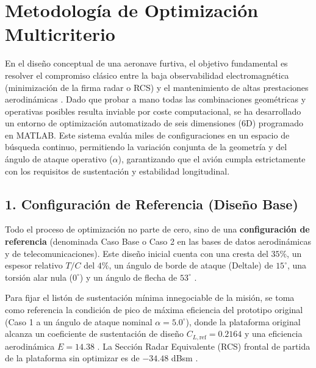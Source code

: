 \documentclass[11pt, a4paper]{article}
\begin{document}
\section*{Metodología de Optimización Multicriterio}

En el diseño conceptual de una aeronave furtiva, el objetivo fundamental es resolver el compromiso clásico entre la baja observabilidad electromagnética (minimización de la firma radar o RCS) y el mantenimiento de altas prestaciones aerodinámicas \cite{raymer, deb}. Dado que probar a mano todas las combinaciones geométricas y operativas posibles resulta inviable por coste computacional, se ha desarrollado un entorno de optimización automatizado de seis dimensiones (6D) programado en MATLAB. Este sistema evalúa miles de configuraciones en un espacio de búsqueda continuo, permitiendo la variación conjunta de la geometría y del ángulo de ataque operativo ($\alpha$), garantizando que el avión cumpla estrictamente con los requisitos de sustentación y estabilidad longitudinal.

\subsection*{1. Configuración de Referencia (Diseño Base)}
Todo el proceso de optimización no parte de cero, sino de una \textbf{configuración de referencia} (denominada Caso Base o Caso 2 en las bases de datos aerodinámicas y de telecomunicaciones). Este diseño inicial cuenta con una cresta del $35\%$, un espesor relativo $T/C$ del $4\%$, un ángulo de borde de ataque (Deltale) de $15^\circ$, una torsión alar nula ($0^\circ$) y un ángulo de flecha de $53^\circ$ \cite{anderson}. 

Para fijar el listón de sustentación mínima innegociable de la misión, se toma como referencia la condición de pico de máxima eficiencia del prototipo original (Caso 1 a un ángulo de ataque nominal $\alpha = 5.0^\circ$), donde la plataforma original alcanza un coeficiente de sustentación de diseño $C_{L,\text{ref}} = 0.2164$ y una eficiencia aerodinámica $E = 14.38$ \cite{anderson}. La Sección Radar Equivalente (RCS) frontal de partida de la plataforma sin optimizar es de $-34.48$ dBsm \cite{anderson}.
\end{document}
